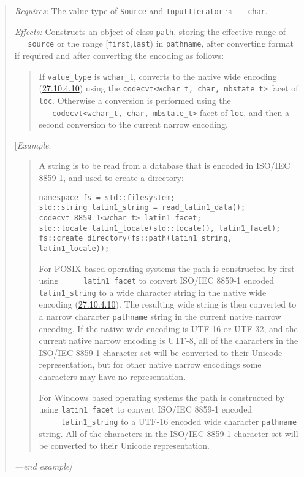 \begin{quote}
\emph{Requires:} The value type of \texttt{Source} and
\texttt{InputIterator} is \texttt{\ \ \ char}.

\emph{Effects:} Constructs an object of class \texttt{path}, storing the
effective range of \texttt{\ \ \ source} or the range
{[}\texttt{first},\texttt{last}) in \texttt{pathname}, after converting
format if required and after converting the encoding as follows:

\begin{quote}
If \texttt{value\_type} is \texttt{wchar\_t}, converts to the native
wide encoding (\hyperref[fs.def.native.encode]{27.10.4.10}) using the
\texttt{codecvt\textless{}wchar\_t,\ char,\ mbstate\_t\textgreater{}}
facet of \texttt{loc}. Otherwise a conversion is performed using the
\texttt{\ \ \ codecvt\textless{}wchar\_t,\ char,\ mbstate\_t\textgreater{}}
facet of \texttt{loc}, and then a second conversion to the current
narrow encoding.
\end{quote}

{[}\emph{Example}:

\begin{quote}
A string is to be read from a database that is encoded in ISO/IEC
8859-1, and used to create a directory:

\begin{verbatim}
namespace fs = std::filesystem;
std::string latin1_string = read_latin1_data();
codecvt_8859_1<wchar_t> latin1_facet;
std::locale latin1_locale(std::locale(), latin1_facet);
fs::create_directory(fs::path(latin1_string, latin1_locale));
\end{verbatim}

For POSIX based operating systems the path is constructed by first using
\texttt{\ \ \ \ \ latin1\_facet} to convert ISO/IEC 8859-1 encoded
\texttt{latin1\_string} to a wide character string in the native wide
encoding (\hyperref[fs.def.native.encode]{27.10.4.10}). The resulting
wide string is then converted to a narrow character \texttt{pathname}
string in the current native narrow encoding. If the native wide
encoding is UTF-16 or UTF-32, and the current native narrow encoding is
UTF-8, all of the characters in the ISO/IEC 8859-1 character set will be
converted to their Unicode representation, but for other native narrow
encodings some characters may have no representation.

For Windows based operating systems the path is constructed by using
\texttt{latin1\_facet} to convert ISO/IEC 8859-1 encoded
\texttt{\ \ \ \ \ latin1\_string} to a UTF-16 encoded wide character
\texttt{pathname} string. All of the characters in the ISO/IEC 8859-1
character set will be converted to their Unicode representation.
\end{quote}

\emph{---end example{]}}
\end{quote}

